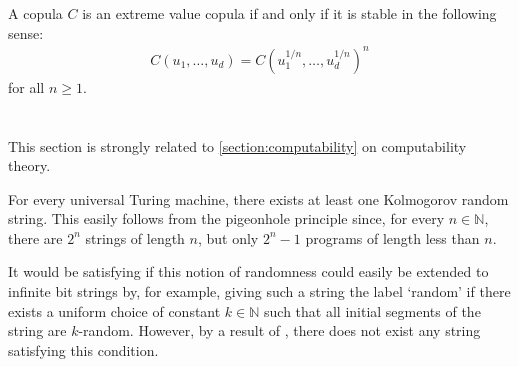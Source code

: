     \begin{property}
        A copula $C$ is an extreme value copula if and only if it is stable in the following sense:
        \begin{gather}
            C(u_1,\ldots,u_d) = C\left(u_1^{1/n},\ldots,u_d^{1/n}\right)^n
        \end{gather}
        for all $n\geq1$.
    \end{property}

\section{}

    This section is strongly related to \cref{section:computability} on computability theory.


    \begin{property}
        For every universal Turing machine, there exists at least one Kolmogorov random string. This easily follows from the pigeonhole principle since, for every $n\in\mathbb{N}$, there are $2^n$ strings of length $n$, but only $2^n-1$ programs of length less than $n$.
    \end{property}

    It would be satisfying if this notion of randomness could easily be extended to infinite bit strings by, for example, giving such a string the label `random' if there exists a uniform choice of constant $k\in\mathbb{N}$ such that all initial segments of the string are $k$-random. However, by a result of , there does not exist any string satisfying this condition.

